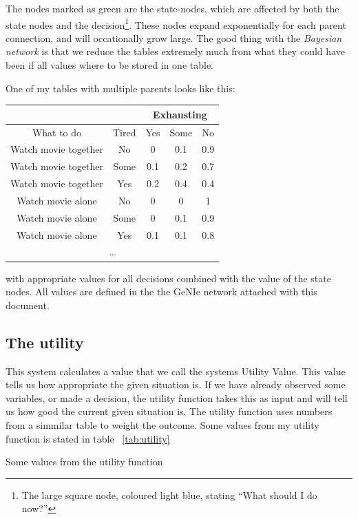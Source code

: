 The nodes marked as green are the state-nodes, which are affected by both
the state nodes and the decision\footnote{The large square node, coloured
light blue, stating ``What should I do now?''}. These nodes expand exponentially for
each parent connection, and will occationally grow large. The good thing with
the \emph{Bayesian network} is that we reduce the tables extremely much from
what they could have been if all values where to be stored in one table.

One of my tables with multiple parents looks like this:

\begin{tabular}{|c|c||c|c|c|}
\hline
\multicolumn{2}{|c|}{} & \multicolumn{3}{|c|}{Exhausting}\\
\hline
What to do & Tired & Yes & Some & No \\
\hline
\hline
Watch movie together & No & 0 & 0.1 & 0.9\\
Watch movie together & Some & 0.1 & 0.2 & 0.7\\
Watch movie together & Yes & 0.2 & 0.4 & 0.4\\
\hline
Watch movie alone & No & 0 & 0 & 1\\
Watch movie alone & Some & 0 & 0.1 & 0.9\\
Watch movie alone & Yes & 0.1 & 0.1 & 0.8\\
\hline
\multicolumn{5}{c}{\ldots}\\
\end{tabular}

with appropriate values for all decisions combined with the value of the state
nodes. All values are defined in the the GeNIe network attached with this
document.

\subsection{The utility}
This system calculates a value that we call the systems Utility Value. This
value tells us how appropriate the given situation is. If we have already
observed some variables, or made a decision, the utility function takes this as
input and will tell us how good the current given situation is. The utility
function uses numbers from a simmilar table to weight the outcome. Some values
from my utility function is stated in table ~\ref{tab:utility}
\begin{table}[h]

\caption{Some values from the utility function}
\label{tab:utility}
\end{table}

